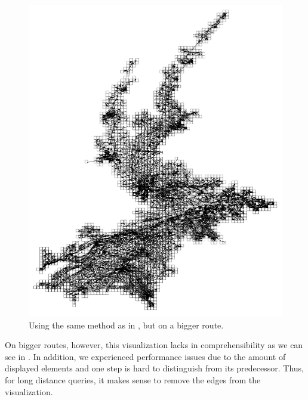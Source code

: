 \documentclass
[
    paper = a4,
    pagesize,
    12 pt,
    oneside,                       %
    open = right,
    DIV = calc,
    BCOR = 0 mm,                   %
    bibtotoc
]
{scrbook}
\begin{document}
\begin{figure}
    \includegraphics[width=\textwidth]{Images/vis-rectangular-tiles.png}
\caption[]{Using the same method as in , but on a bigger route.}
\label{fig:rectangle_tiles_big}
\end{figure}

On bigger routes, however, this visualization lacks in comprehensibility as we can see in .
In addition, we experienced performance issues due to the amount of displayed elements and one step is hard to distinguish from its predecessor.
Thus, for long distance queries, it makes sense to remove the edges from the visualization.
\end{document}
